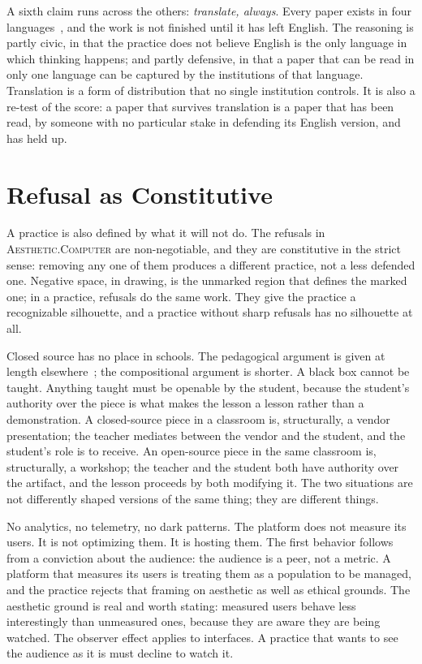 \documentclass[10pt,letterpaper,twocolumn]{article}
\newcommand{\ac}{\textsc{Aesthetic.Computer}}
\begin{document}
A sixth claim runs across the others: \emph{translate, always}. Every paper exists in four languages~\citep{scudder2026score}, and the work is not finished until it has left English. The reasoning is partly civic, in that the practice does not believe English is the only language in which thinking happens; and partly defensive, in that a paper that can be read in only one language can be captured by the institutions of that language. Translation is a form of distribution that no single institution controls. It is also a re-test of the score: a paper that survives translation is a paper that has been read, by someone with no particular stake in defending its English version, and has held up.

\section{Refusal as Constitutive}

A practice is also defined by what it will not do. The refusals in \ac{} are non-negotiable, and they are constitutive in the strict sense: removing any one of them produces a different practice, not a less defended one. Negative space, in drawing, is the unmarked region that defines the marked one; in a practice, refusals do the same work. They give the practice a recognizable silhouette, and a practice without sharp refusals has no silhouette at all.

Closed source has no place in schools. The pedagogical argument is given at length elsewhere~\citep{scudder2026openschools}; the compositional argument is shorter. A black box cannot be taught. Anything taught must be openable by the student, because the student's authority over the piece is what makes the lesson a lesson rather than a demonstration. A closed-source piece in a classroom is, structurally, a vendor presentation; the teacher mediates between the vendor and the student, and the student's role is to receive. An open-source piece in the same classroom is, structurally, a workshop; the teacher and the student both have authority over the artifact, and the lesson proceeds by both modifying it. The two situations are not differently shaped versions of the same thing; they are different things.

No analytics, no telemetry, no dark patterns. The platform does not measure its users. It is not optimizing them. It is hosting them. The first behavior follows from a conviction about the audience: the audience is a peer, not a metric. A platform that measures its users is treating them as a population to be managed, and the practice rejects that framing on aesthetic as well as ethical grounds. The aesthetic ground is real and worth stating: measured users behave less interestingly than unmeasured ones, because they are aware they are being watched. The observer effect applies to interfaces. A practice that wants to see the audience as it is must decline to watch it.
\end{document}
